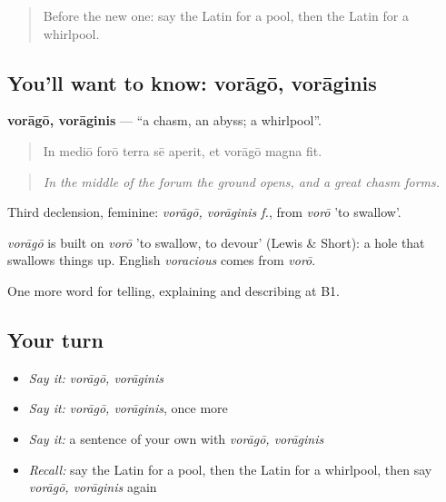 \label{lesson:LA-C483-vorago}



\begin{quote}
Before the new one: say the Latin for a pool, then the Latin for a whirlpool.
\end{quote}

\subsection*{You'll want to know: vorāgō, vorāginis}
\textbf{vorāgō, vorāginis} — \textquotedblleft{}a chasm, an abyss; a whirlpool\textquotedblright{}.

\begin{quote}
In mediō forō terra sē aperit, et vorāgō magna fit.
\end{quote}

\begin{quote}
\emph{In the middle of the forum the ground opens, and a great chasm forms.}
\end{quote}

Third declension, feminine: \emph{vorāgō, vorāginis f.}, from \emph{vorō} 'to swallow'.

\begin{cousinweb}
\emph{vorāgō} is built on \emph{vorō} 'to swallow, to devour' (Lewis \& Short): a hole that swallows things up. English \emph{voracious} comes from \emph{vorō}.
\end{cousinweb}

\begin{grammarlens}[title={What you've built}]
One more word for telling, explaining and describing at B1.
\end{grammarlens}

\subsection*{Your turn}
\begin{itemize}
\raggedright
  \item \emph{Say it:} \emph{vorāgō, vorāginis}
  \item \emph{Say it:} \emph{vorāgō, vorāginis}, once more
  \item \emph{Say it:} a sentence of your own with \emph{vorāgō, vorāginis}
  \item \emph{Recall:} say the Latin for a pool, then the Latin for a whirlpool, then say \emph{vorāgō, vorāginis} again
\end{itemize}

